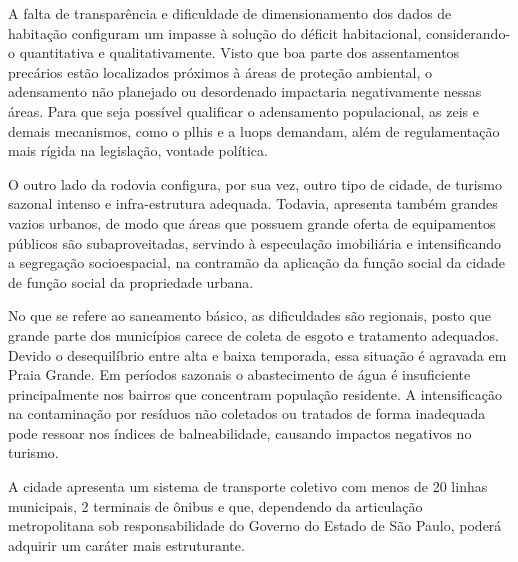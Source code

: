 	A falta de transparência e dificuldade de dimensionamento dos dados de habitação configuram um  impasse à solução do déficit habitacional, considerando-o quantitativa e qualitativamente. Visto que boa parte dos assentamentos precários estão localizados próximos à áreas de proteção ambiental, o adensamento não planejado ou desordenado impactaria negativamente nessas áreas. Para que seja possível qualificar o adensamento populacional, as \gls{zeis} e demais mecanismos, como o \gls{plhis} e a \gls{luops} demandam, além de regulamentação mais rígida na legislação,  vontade política.
	
	O outro lado da rodovia configura, por sua vez, outro tipo de cidade, de turismo sazonal intenso e infra-estrutura adequada. Todavia, apresenta também grandes vazios urbanos, de modo que áreas que possuem grande oferta de equipamentos públicos são subaproveitadas, servindo à especulação imobiliária e intensificando a segregação socioespacial, na contramão da aplicação da função social da cidade de função social  da propriedade urbana.
	
	No que se refere ao saneamento básico, as dificuldades são regionais, posto que grande parte dos municípios carece de coleta de esgoto e tratamento adequados. Devido o desequilíbrio entre alta e baixa temporada, essa situação é agravada em Praia Grande. Em períodos sazonais o abastecimento de água é insuficiente principalmente nos bairros que concentram população residente. A intensificação na contaminação por resíduos não coletados ou tratados de forma inadequada pode ressoar nos índices de balneabilidade, causando impactos negativos no turismo.
	
	A cidade apresenta um sistema de transporte coletivo com menos de 20 linhas municipais, 2 terminais de ônibus e que, dependendo da articulação metropolitana sob responsabilidade do Governo do Estado de São Paulo, poderá adquirir um caráter mais estruturante.
    
